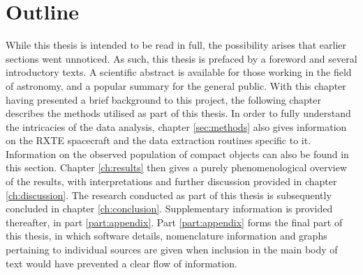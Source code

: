 \newpage
\section{Outline}
While this thesis is intended to be read in full, the possibility arises that earlier sections went unnoticed. As such, this thesis is prefaced by a foreword and several introductory texts. A scientific abstract is available for those working in the field of astronomy, and a popular summary for the general public. With this chapter having presented a brief background to this project, the following chapter describes the methods utilised as part of this thesis. In order to fully understand the intricacies of the data analysis, chapter \ref{sec:methods} also gives information on the \ac{RXTE} spacecraft and the data extraction routines specific to it. Information on the observed population of compact objects can also be found in this section. Chapter \ref{ch:results} then gives a purely phenomenological overview of the results, with interpretations and further discussion provided in chapter \ref{ch:discussion}. The research conducted as part of this thesis is subsequently concluded in chapter \ref{ch:conclusion}. Supplementary information is provided thereafter, in part \ref{part:appendix}. Part \ref{part:appendix} forms the final part of this thesis, in which software details, nomenclature information and graphs pertaining to individual sources are given when inclusion in the main body of text would have prevented a clear flow of information.


